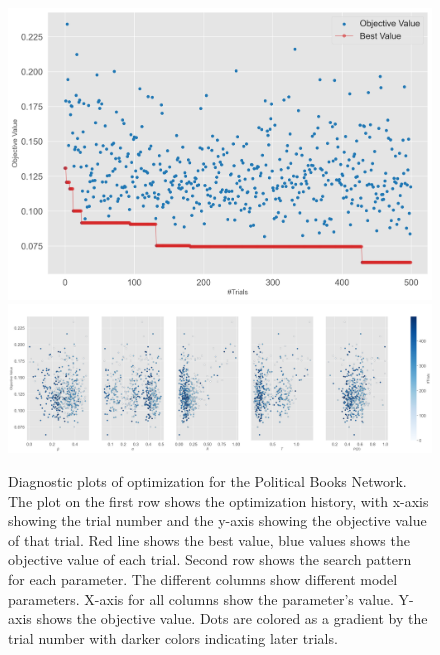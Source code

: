\documentclass[11pt]{article}
\begin{document}
\begin{figure}[H]
    \centering
    \includegraphics[width=.7\linewidth]{../plots/overall/Optimization_History_polbooks.png}
    \includegraphics[width=.7\linewidth]{../plots/overall/Plot_Slice_polbooks.png}
  \caption{Diagnostic plots of optimization for the Political Books Network. The plot on the first row shows the optimization history, with x-axis showing the trial number and the y-axis showing the objective value of that trial. Red line shows the best value, blue values shows the objective value of each trial. Second row shows the search pattern for each parameter. The different columns show different model parameters. X-axis for all columns show the parameter's value. Y-axis shows the objective value. Dots are colored as a gradient by the trial number with darker colors indicating later trials.}
  \label{appendix:optimization_polbooks}
\end{figure}
\end{document}
